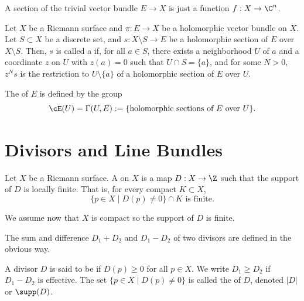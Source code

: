 \documentclass[11pt]{report}
\begin{document}
\begin{ex}
    A section of the trivial vector bundle $E \to X$ is just a function $f:X \to \C^n$.
\end{ex}

\begin{defn}
    Let $X$ be a Riemann surface and $\pi :E \to X$ be a holomorphic vector bundle on $X$. Let $S \subset X$ be a discrete set, and $s:X\setminus S \to E$ be a holomorphic section of $E$ over $X \setminus S$. Then, $s$ is called a  if, for all $a \in S$, there exists a neighborhood $U$ of $a$ and a coordinate $z$ on $U$ with $z(a)=0$ such that $U \cap S = \{a\}$, and for some $N>0$, $z^Ns$ is the restriction to $U \setminus \{a\}$ of a holomorphic section of $E$ over $U$.
\end{defn}

\begin{defn}
    The  of $E$ is defined by the group 
    \[
    \cE(U)=\Gamma(U,E):=\{\text{holomorphic sections of } E \text{ over } U\}.
    \] 
\end{defn}



\section{Divisors and Line Bundles}

\begin{defn}
    Let $X$ be a Riemann surface. A  on $X$ is a map $D: X \to \Z$ such that the support of $D$ is locally finite. That is, for every compact $K \subset X$,
    \[
    \{p \in X \mid D(p) \neq 0\} \cap K \text{ is finite.}
    \]
\end{defn}
We assume now that $X$ is compact so the support of $D$ is finite. 
\begin{defn}
    The sum and difference $D_1+D_2$ and $D_1-D_2$ of two divisors are defined in the obvious way.

    A divisor $D$ is said to be  if $D(p) \geq 0$ for all $p \in X$. We write $D_1 \geq D_2$ if $D_1 -D_2$ is effective. The set $\{p \in X \mid D(p) \neq 0\}$ is called the  of $D$, denoted $|D|$ or $\supp (D)$.
\end{defn}
\end{document}
